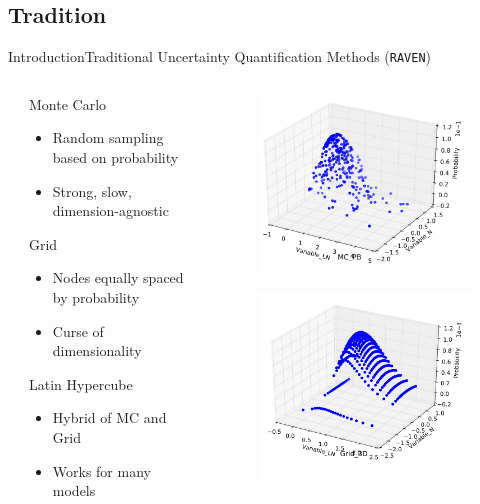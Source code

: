 \documentclass{beamer}
\newcommand{\raven}{\texttt{RAVEN}}
\begin{document}
\subsection{Tradition}
\begin{frame}{Introduction}{Traditional Uncertainty Quantification Methods (\raven{})}\vspace{-10pt}
  \begin{columns}
  \begin{column}{0.1\textwidth}
  \end{column}
  \begin{column}{0.45\textwidth}
    Monte Carlo
      \begin{itemize}
        \item Random sampling based on probability
        \item Strong, slow, dimension-agnostic
      \end{itemize}
    Grid
      \begin{itemize}
        \item Nodes equally spaced by probability
        \item Curse of dimensionality
      \end{itemize}
    Latin Hypercube
      \begin{itemize}
        \item Hybrid of MC and Grid
        \item Works for many models
      \end{itemize}
  \end{column}
  \begin{column}{0.45\textwidth}
    \begin{figure}[h!]
      \centering
      \includegraphics[width=0.4\linewidth]{mc_prob}
    \end{figure}
    \vspace{-10pt}
    \begin{figure}[h!]
      \centering
      \includegraphics[width=0.4\linewidth]{grid_prob}

\end{figure}
\end{column}
\end{columns}
\end{frame}
\end{document}
